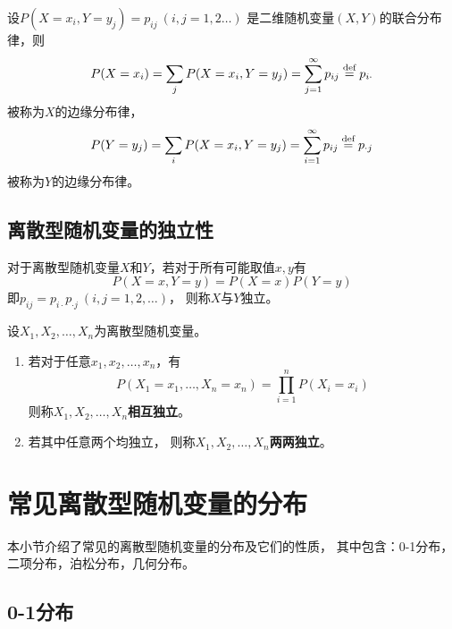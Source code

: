 \begin{definition}
  设$P(X=x_i,Y=y_j)=p_{ij}\ (i,j=1,2\dots)$
  是二维随机变量$(X,Y)$的联合分布律，则
  \begin{displaymath}
    P(X=x_i) = \sum_{j} P(X=x_i,Y=y_j) = \sum_{j=1}^{\infty}p_{ij}
    \overset{\text{def}}{=} p_{i\cdot}
  \end{displaymath}
  被称为$X$的边缘分布律，
  \begin{displaymath}
    P(Y=y_j) = \sum_{i} P(X=x_i,Y=y_j) = \sum_{i=1}^{\infty}p_{ij}
    \overset{\text{def}}{=} p_{\cdot j}
  \end{displaymath}
  被称为$Y$的边缘分布律。
\end{definition}

\subsection{离散型随机变量的独立性}
\begin{definition}[两个离散型随机变量的独立性]
  对于离散型随机变量$X$和$Y$，若对于所有可能取值$x,y$有
  \begin{displaymath}
    P(X=x,Y=y)=P(X=x)P(Y=y)
  \end{displaymath}
  即$p_{ij}=p_{i\cdot}p_{\cdot j}\ (i,j=1,2,\dots)$，
  则称$X$与$Y$独立。
\end{definition}

\begin{definition}[多离散型随机变量的独立性]
  设$X_1,X_2,\dots,X_n$为离散型随机变量。
  \begin{enumerate}
    \item 
    若对于任意$x_1,x_2,\dots,x_n$，有
    \begin{displaymath}
      P(X_1=x_1,\dots,X_n=x_n)=\prod_{i=1}^{n}P(X_i=x_i)
    \end{displaymath}
    则称$X_1,X_2,\dots,X_n$\textbf{相互独立}。
    \item
    若其中任意两个均独立，
    则称$X_1,X_2,\dots,X_n$\textbf{两两独立}。
  \end{enumerate}
\end{definition}

\section{常见离散型随机变量的分布}
本小节介绍了常见的离散型随机变量的分布及它们的性质，
其中包含：0-1分布，二项分布，泊松分布，几何分布。

\subsection{0-1分布}

